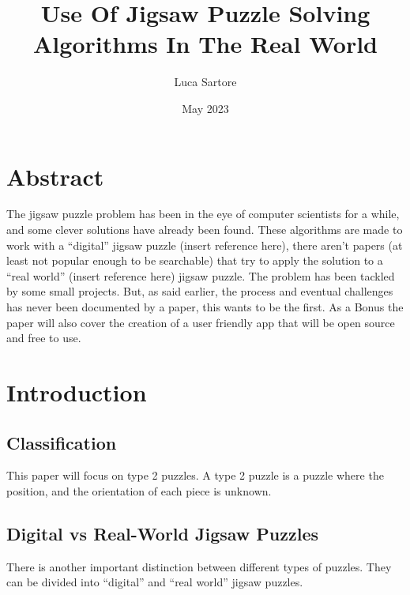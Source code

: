 \documentclass{article}
\title{Use Of Jigsaw Puzzle Solving Algorithms In The Real World}
\author{Luca Sartore}
\date{May 2023}
\begin{document}
\maketitle

\newpage

\tableofcontents

\newpage

\section{Abstract}
The jigsaw puzzle problem has been in the eye of computer scientists for a while,
and some clever solutions have already been found. These algorithms are made to
work with a “digital” jigsaw puzzle (insert reference here), there aren't papers
(at least not popular enough to be searchable) that try to apply the solution
to a “real world” (insert reference here) jigsaw puzzle.\newline
The problem has been tackled by some small projects. But, as said earlier,
the process and eventual challenges has never been documented by a paper,
this wants to be the first.\newline
As a Bonus the paper will also cover the creation of a user friendly app
that will be open source and free to use.

\section{Introduction}
\subsection{Classification}
This paper will focus on type 2 puzzles. A type 2 puzzle is a puzzle where the position, and the orientation of each piece is unknown. 
\subsection{Digital vs Real-World Jigsaw Puzzles}

There is  another important distinction between different types of puzzles. They can be divided into “digital” and “real world” jigsaw puzzles.
\end{document}
